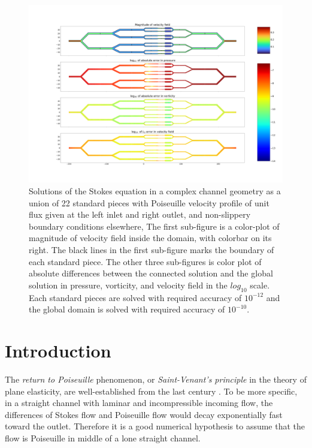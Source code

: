 \documentclass[10pt,twocolumn]{article}
\begin{document}
\begin{figure}[t] 
  \centering
  \includegraphics[width=\textwidth]{pic/connection-error-rough.png}
  \caption{Solutions of the Stokes equation in a complex channel geometry as a union of 22 standard pieces
    with Poiseuille velocity profile of unit flux given at the left inlet and right outlet, and non-slippery boundary conditions elsewhere, 
    The first sub-figure is a color-plot of magnitude of velocity field inside the 
    domain, with colorbar on its right. The black lines in the 
    first sub-figure marks the boundary of each standard piece. 
    The other three sub-figures is color plot of absolute differences 
    between the connected solution and the global solution in pressure, 
    vorticity, and velocity field in the $log_{10}$ scale. Each standard pieces are solved
    with required accuracy of $10^{-12}$ and the global domain is solved with 
    required accuracy of $10^{-10}$.}
  \label{fig:connection-error}

\end{figure}

\section{Introduction}


The \textit{return to Poiseuille} phenomenon, or \textit{Saint-Venant's principle} in the theory of plane elasticity, 
are well-established from the last century 
\cite{coRecentDevelopmentsConcerning1983,gregoryTractionBoundaryValue1980,horganDECAYESTIMATESBIHARMONIC1989}. 
To be more specific, in a straight channel with laminar and incompressible incoming flow, the differences of Stokes flow and Poiseuille flow would decay exponentially fast toward the outlet. 
Therefore it is a good numerical hypothesis to assume that the flow is Poiseuille in middle of a lone straight channel.
\end{document}
